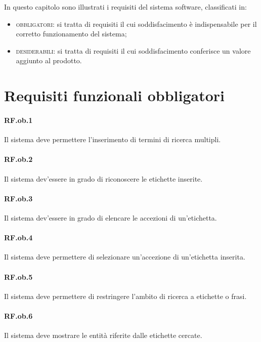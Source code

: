 \documentclass[10pt,a4paper,headinclude,footinclude,hidelinks]{scrreprt} %
\begin{document}
	In questo capitolo sono illustrati i requisiti del sistema software, classificati in:
	\begin{itemize}
	\item \textsc{obbligatori}: si tratta di requisiti il cui soddisfacimento è indispensabile per il corretto funzionamento del sistema;
	\item \textsc{desiderabili}: si tratta di requisiti il cui soddisfacimento conferisce un valore aggiunto al prodotto. 
	\end{itemize}

	\section{Requisiti funzionali obbligatori}
	\label{ch:stage:ar:requisiti:ob}

	\paragraph{RF.ob.1} Il sistema deve permettere l'inserimento di termini di ricerca multipli.

	\paragraph{RF.ob.2} Il sistema dev'essere in grado di riconoscere le etichette inserite.

	\paragraph{RF.ob.3} Il sistema dev'essere in grado di elencare le accezioni di un'etichetta.

	\paragraph{RF.ob.4} Il sistema deve permettere di selezionare un'accezione di un'etichetta inserita.

	\paragraph{RF.ob.5} Il sistema deve permettere di restringere l'ambito di ricerca a etichette o frasi.

	\paragraph{RF.ob.6} Il sistema deve mostrare le entità riferite dalle etichette cercate.
\end{document}
